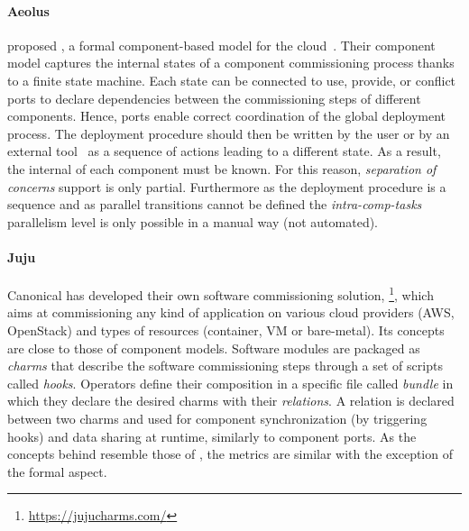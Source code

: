 \paragraph{Aeolus}
\citeauthor{dicosmo2014ic} proposed \aeolus, a formal component-based
model for the cloud~\cite{dicosmo2014ic}. Their component model
captures the internal states of a component commissioning process
thanks to a finite state machine. Each state can be connected to use,
provide, or conflict ports to declare dependencies between the
commissioning steps of different components. Hence, ports enable
correct coordination of the global deployment process. The deployment
procedure should then be written by the user or by an external
tool~\cite{dicosmo:hal-01233489} as a sequence of actions
leading to a different state. As a result, the internal of each
component must be known. For this reason, \emph{separation of
  concerns} support is only partial. Furthermore as the deployment
procedure is a sequence and as parallel transitions cannot be defined
the \emph{intra-comp-tasks} parallelism level is only possible in a
manual way (not automated).

\paragraph{Juju}
Canonical has developed their own software commissioning solution,
\juju\footnote{\url{https://jujucharms.com/}}, which aims at commissioning any
kind of application on various cloud providers (\eg AWS,
OpenStack) and types of resources (container, VM or
bare-metal). Its concepts are close to those of component
models. Software modules are packaged as \juju \emph{charms} that
describe the software commissioning steps through a set of scripts
called
\emph{hooks}. Operators define their composition in a specific file
called \emph{bundle} in which they declare the desired charms with
their \emph{relations}. A relation is declared between two charms and
used for component synchronization (by triggering hooks) and data
sharing at runtime, similarly to component ports. As the concepts
behind \juju resemble those of \aeolus, the metrics are similar with
the exception of the formal aspect.

\begin{table*}[tp]
  \centering
  \small
  
  \caption{Comparison of commissioning solutions based on aspects
  regarding software engineering (SE), parallelism and formalism. A supported metric is denoted
  \checkmark and counts for 3 points in the score; a partially
  supported metric is denoted (\checkmark) and counts for 2 points; a manually supported metric is denoted \emph{M} and counts for 1 point; and finally a non-supported metric is denoted -.}
  \label{tab:comparison}
\end{table*}

